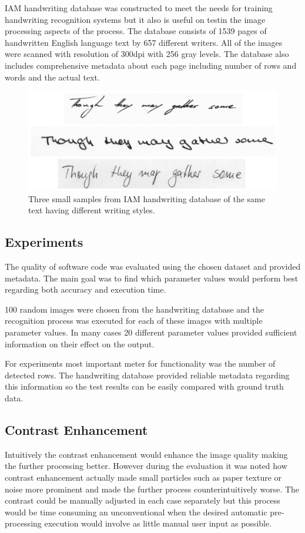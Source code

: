 \documentclass{article}
\begin{document}
    IAM handwriting database was constructed to meet the needs for training handwriting recognition systems but it also is useful on testin the image processing aspects of the process. The database consists of 1539 pages of handwritten English language text by 657 different writers. All of the images were scanned with resolution of 300dpi with 256 gray levels. The database also includes comprehensive metadata about each page including number of rows and words and the actual text. \cite{IAM}

    \begin{figure}
      \centering
      \includegraphics[natwidth=1530,natheight=660,scale=0.3]{iamsample.png}
      \caption{Three small samples from IAM handwriting database of the same text having different writing styles. \label{fig:iamsample} }
    \end{figure}

  \subsection{Experiments}
    The quality of software code was evaluated using the chosen dataset and provided metadata. The main goal was to find which parameter values would perform best regarding both accuracy and execution time.

    100 random images were chosen from the handwriting database and the recognition process was executed for each of these images with multiple parameter values. In many cases 20 different parameter values provided sufficient information on their effect on the output.

    For experiments most important meter for functionality was the number of detected rows. The handwriting database provided reliable metadata regarding this information so the test results can be easily compared with ground truth data.


  \subsection{Contrast Enhancement}
    Intuitively the contrast enhancement would enhance the image quality making the further processing better. However during the evaluation it was noted how contrast enhancement actually made small particles such as paper texture or noise more prominent and made the further process counterintuitively worse. The contrast could be manually adjusted in each case separately but this process would be time consuming an unconventional when the desired automatic pre-processing execution would involve as little manual user input as possible.
\end{document}
